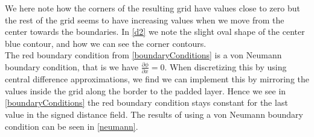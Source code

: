 We here note how the corners of the resulting grid have values close to zero but the rest of the grid seems to have increasing values when we move from the center towards the boundaries. In \autoref{d2} we note the slight oval shape of the center blue contour, and how we can see the corner contours.\\
The red boundary condition from \autoref{boundaryConditions} is a von Neumann boundary condition, that is we have $\frac{\partial \phi}{\partial x} = 0$. When discretizing this by using central difference approximations, we find we can implement this by mirroring the values inside the grid along the border to the padded layer. Hence we see in \autoref{boundaryConditions} the red boundary condition stays constant for the last value in the signed distance field. The results of using a von Neumann boundary condition can be seen in \autoref{neumann}.
